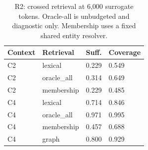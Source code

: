 \begin{table}[t]
\centering\footnotesize
\caption{R2: crossed retrieval at 6,000 surrogate tokens. Oracle-all is unbudgeted and diagnostic only. Membership uses a fixed shared entity resolver.}
\label{tab:revision-retrieval}
\begin{tabular}{@{}llll@{}}
\toprule
Context & Retrieval & Suff. & Coverage \\
\midrule
C2 & lexical & 0.229 & 0.549 \\
C2 & oracle\_all & 0.314 & 0.649 \\
C2 & membership & 0.229 & 0.485 \\
C4 & lexical & 0.714 & 0.846 \\
C4 & oracle\_all & 0.971 & 0.995 \\
C4 & membership & 0.457 & 0.688 \\
C4 & graph & 0.800 & 0.929 \\
\bottomrule
\end{tabular}
\end{table}
